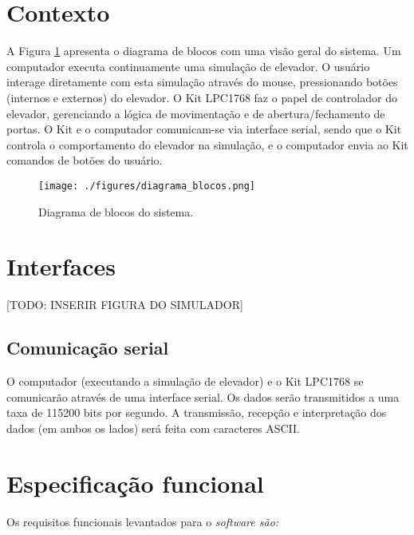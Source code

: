 \section{Contexto}

A Figura \ref{fig:diagrama_blocos} apresenta o diagrama de blocos com uma visão geral do sistema. Um computador executa continuamente uma simulação de elevador. O usuário interage diretamente com esta simulação através do mouse, pressionando botões (internos e externos) do elevador. O Kit LPC1768 faz o papel de controlador do elevador, gerenciando a lógica de movimentação e de abertura/fechamento de portas. O Kit e o computador comunicam-se via interface serial, sendo que o Kit controla o comportamento do elevador na simulação, e o computador envia ao Kit comandos de botões do usuário. 

\begin{figure}[h]
    \centering
    \texttt{[image: ./figures/diagrama\_blocos.png]}
    \caption{Diagrama de blocos do sistema.}
    \label{fig:diagrama_blocos}
\end{figure}


\section{Interfaces}
[TODO: INSERIR FIGURA DO SIMULADOR]

\subsection{Comunicação serial}
O computador (executando a simulação de elevador) e o Kit LPC1768 se comunicarão através de uma interface serial. Os dados serão transmitidos a uma taxa de 115200 bits por segundo. A transmissão, recepção e interpretação dos dados (em ambos os lados) será feita com caracteres ASCII.


\section{Especificação funcional}
\label{sec:espec_funcional}



Os requisitos funcionais levantados para o \it{software} são:

